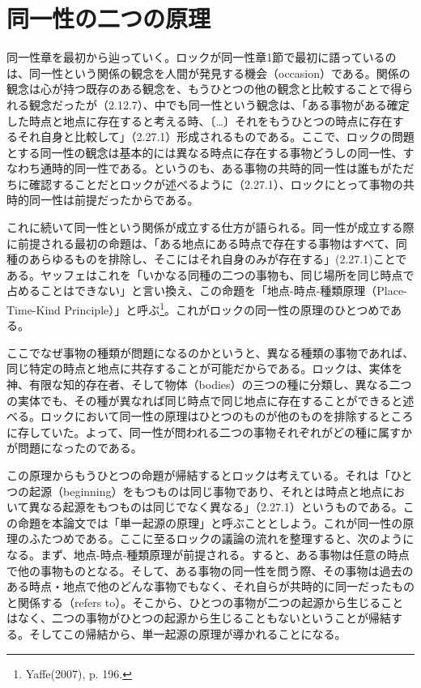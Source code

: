 \documentclass[a4j,oneside]{jsbook}
\begin{document}
\section{
同一性の二つの原理
}
同一性章を最初から辿っていく。ロックが同一性章1節で最初に語っているのは、同一性という関係の観念を人間が発見する機会（occasion）である。関係の観念は心が持つ既存のある観念を、もうひとつの他の観念と比較することで得られる観念だったが（2.12.7）、中でも同一性という観念は、「ある事物がある確定した時点と地点に存在すると考える時、〔…〕それをもうひとつの時点に存在するそれ自身と比較して」（2.27.1）形成されるものである。ここで、ロックの問題とする同一性の観念は基本的には異なる時点に存在する事物どうしの同一性、すなわち通時的同一性である。というのも、ある事物の共時的同一性は誰もがただちに確認することだとロックが述べるように（2.27.1）、ロックにとって事物の共時的同一性は前提だったからである。
\par
これに続いて同一性という関係が成立する仕方が語られる。同一性が成立する際に前提される最初の命題は、「ある地点にある時点で存在する事物はすべて、同種のあらゆるものを排除し、そこにはそれ自身のみが存在する」(2.27.1)ことである。ヤッフェはこれを「いかなる同種の二つの事物も、同じ場所を同じ時点で占めることはできない」と言い換え、この命題を「地点-時点-種類原理（Place-Time-Kind Principle）」と呼ぶ\footnote{Yaffe(2007), p. 196.}。これがロックの同一性の原理のひとつめである。
\par
ここでなぜ事物の種類が問題になるのかというと、異なる種類の事物であれば、同じ特定の時点と地点に共存することが可能だからである。ロックは、実体を神、有限な知的存在者、そして物体（bodies）の三つの種に分類し、異なる二つの実体でも、その種が異なれば同じ時点で同じ地点に存在することができると述べる。ロックにおいて同一性の原理はひとつのものが他のものを排除するところに存していた。よって、同一性が問われる二つの事物それぞれがどの種に属すかが問題になったのである。
\par
この原理からもうひとつの命題が帰結するとロックは考えている。それは「ひとつの起源（beginning）をもつものは同じ事物であり、それとは時点と地点において異なる起源をもつものは同じでなく異なる」（2.27.1）というものである。この命題を本論文では「単一起源の原理」と呼ぶこととしよう。これが同一性の原理のふたつめである。ここに至るロックの議論の流れを整理すると、次のようになる。まず、地点-時点-種類原理が前提される。すると、ある事物は任意の時点で他の事物ものとなる。そして、ある事物の同一性を問う際、その事物は過去のある時点・地点で他のどんな事物でもなく、それ自らが共時的に同一だったものと関係する（refers to）。そこから、ひとつの事物が二つの起源から生じることはなく、二つの事物がひとつの起源から生じることもないということが帰結する。そしてこの帰結から、単一起源の原理が導かれることになる。
\end{document}
